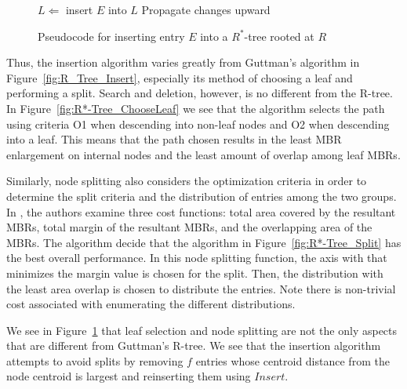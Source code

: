 \begin{figure}[ht!]
\begin{algorithmic}
		\State $L\Leftarrow$ 
			\State insert $E$ into $L$
		\Else
				\State {}
			\Else
				\State {}
			\EndIf
		\EndIf
		\State Propagate changes upward
	\EndFunction
\end{algorithmic}
\caption{Pseudocode for inserting entry $E$ into a $R^{*}$-tree rooted at $R$}
\label{fig:R*-Tree_Insert}
\end{figure}

Thus, the insertion algorithm varies greatly from Guttman's algorithm in 
Figure~\ref{fig:R_Tree_Insert}, especially its method of choosing a leaf and performing a 
split. Search and deletion, however, is no different from the R-tree. In 
Figure~\ref{fig:R*-Tree_ChooseLeaf} we see that the algorithm selects the path using criteria
O1 when descending into non-leaf nodes and O2 when descending into a leaf. This means that
the path chosen results in the least MBR enlargement on internal nodes and the least 
amount of overlap among leaf MBRs. 

Similarly, node splitting also considers the optimization criteria in order to determine
the split criteria and the distribution of entries among the two groups. In \cite{Beckmann:1990:RER:93597.98741}, 
the authors examine three cost functions: total area covered by the resultant MBRs, total
margin of the resultant MBRs, and the overlapping area of the MBRs. The algorithm decide
that the algorithm in Figure~\ref{fig:R*-Tree_Split} has the best overall performance. In
this node splitting function, the axis with that minimizes the margin value is chosen for
the split. Then, the distribution with the least area overlap is chosen to distribute the
entries. Note there is non-trivial cost associated with enumerating the different 
distributions.

We see in Figure~\ref{fig:R*-Tree_Insert} that leaf selection and node splitting are not
the only aspects that are different from Guttman's R-tree. We see that the insertion 
algorithm attempts to avoid splits by removing $f$ entries whose centroid distance from 
the node centroid is largest and reinserting them using $Insert$. 
 

